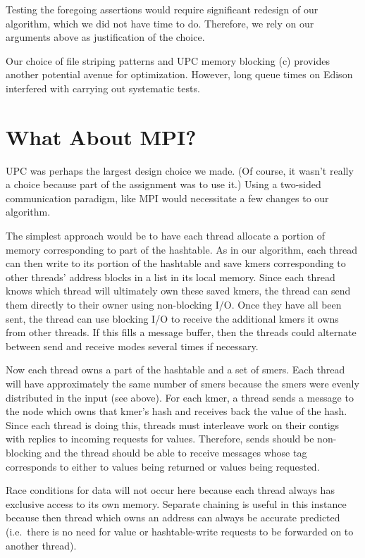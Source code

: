 \documentclass{article}
\begin{document}
Testing the foregoing assertions would require significant redesign of our algorithm, which we did not have time to do. Therefore, we rely on our arguments above as justification of the choice.

Our choice of file striping patterns and UPC memory blocking (c) provides another potential avenue for optimization. However, long queue times on Edison interfered with carrying out systematic tests.

\section{What About MPI?}
UPC was perhaps the largest design choice we made. (Of course, it wasn't really a choice because part of the assignment was to use it.) Using a two-sided communication paradigm, like MPI would necessitate a few changes to our algorithm.

The simplest approach would be to have each thread allocate a portion of memory corresponding to part of the hashtable. As in our algorithm, each thread can then write to its portion of the hashtable and save kmers corresponding to other threads' address blocks in a list in its local memory. Since each thread knows which thread will ultimately own these saved kmers, the thread can send them directly to their owner using non-blocking I/O. Once they have all been sent, the thread can use blocking I/O to receive the additional kmers it owns from other threads. If this fills a message buffer, then the threads could alternate between send and receive modes several times if necessary.

Now each thread owns a part of the hashtable and a set of smers. Each thread will have approximately the same number of smers because the smers were evenly distributed in the input (see above). For each kmer, a thread sends a message to the node which owns that kmer's hash and receives back the value of the hash. Since each thread is doing this, threads must interleave work on their contigs with replies to incoming requests for values. Therefore, sends should be non-blocking and the thread should be able to receive messages whose tag corresponds to either to values being returned or values being requested.

Race conditions for data will not occur here because each thread always has exclusive access to its own memory. Separate chaining is useful in this instance because then thread which owns an address can always be accurate predicted (i.e.\ there is no need for value or hashtable-write requests to be forwarded on to another thread).
\end{document}
